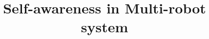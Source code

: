 \documentclass[a4paper]{book}
\title{Self-awareness in Multi-robot system}
\date{}
\begin{document}
    \listoftodos
    \maketitle
    \tableofcontents
    
    \cite{friston-2010-the-free-energy-principle-a-unified-brain-theory}
    
    
    
    
    
    
    
     
     
\end{document}
